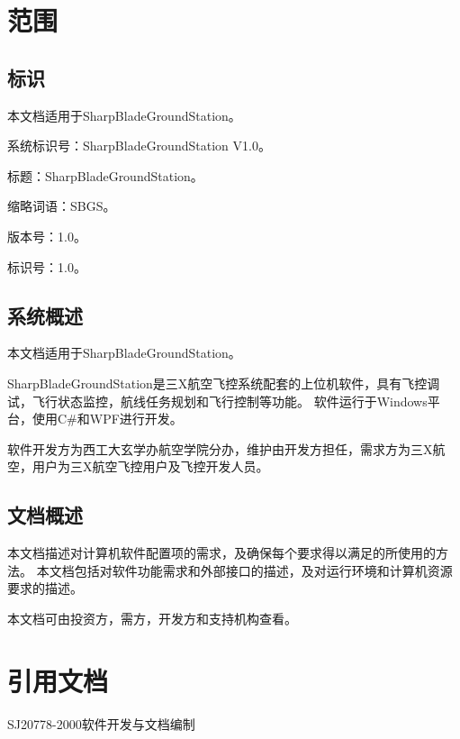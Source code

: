 \newcommand\cscidem{三X航空}
\newcommand\cscidev{西工大玄学办航空学院分办}
\newcommand\csciver{1.0}
\newcommand\csciname{SharpBladeGroundStation}
\newcommand\csciabbr{SBGS}
\section{范围}
\subsection{标识}
本文档适用于\csciname。

系统标识号：SharpBladeGroundStation V1.0。

标题：\csciname。

缩略词语：\csciabbr。

版本号：\csciver。

标识号：\csciver。

\subsection{系统概述}
本文档适用于\csciname。

\csciname 是\cscidem 飞控系统配套的上位机软件，具有飞控调试，飞行状态监控，航线任务规划和飞行控制等功能。
软件运行于Windows平台，使用C\#和WPF进行开发。

软件开发方为\cscidev，维护由开发方担任，需求方为\cscidem，用户为\cscidem 飞控用户及飞控开发人员。


\subsection{文档概述}
本文档描述对计算机软件配置项的需求，及确保每个要求得以满足的所使用的方法。
本文档包括对软件功能需求和外部接口的描述，及对运行环境和计算机资源要求的描述。

本文档可由投资方，需方，开发方和支持机构查看。

\section{引用文档}
SJ20778-2000软件开发与文档编制

\endinput
